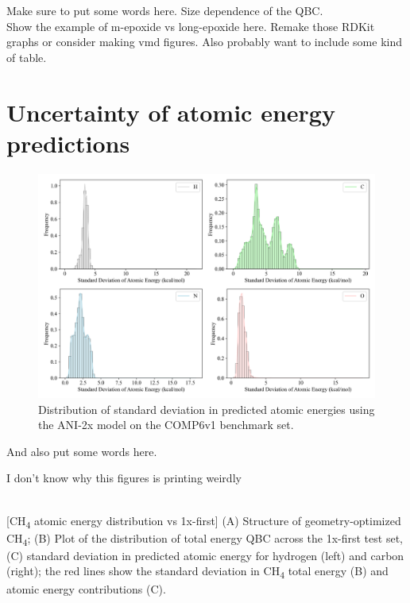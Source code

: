 Make sure to put some words here.
Size dependence of the QBC. \\
Show the example of m-epoxide vs long-epoxide here. Remake those RDKit graphs or consider making vmd figures. 
Also probably want to include some kind of table.

\section{Uncertainty of atomic energy predictions}
\label{sec:uncertainty_atomic_energies}


\begin{figure}[H]
    \centering
    \includegraphics[width=1\linewidth]{Images/2xr_outputs/2xr_comp6v1_stdev-ae-per-atomtype.png}
    \caption[Standard deviation in predicted atomic energy contribution for H, C, N, O atom types]{Distribution of standard deviation in predicted atomic energies using the ANI-2x model on the COMP6v1 benchmark set.}
    \label{fig:2xr_comp6v1_stdev-ae-per-atomtype}
\end{figure}

And also put some words here.
\bigskip




I don't know why this figures is printing weirdly
\\
\begin{flushleft}
\begin{multiFigure}
     \\
[CH\textsubscript{4} atomic energy distribution vs 1x-first]{
(A) Structure of geometry-optimized CH\textsubscript{4}; 
(B) Plot of the distribution of total energy QBC across the 1x-first test set, 
(C) standard deviation in predicted atomic energy for hydrogen (left) and carbon (right); 
the red lines show the standard deviation in CH\textsubscript{4} total energy (B) and atomic energy contributions (C).
}
\label{fig:ch4_stdev_ae}
\end{multiFigure}
\end{flushleft}



